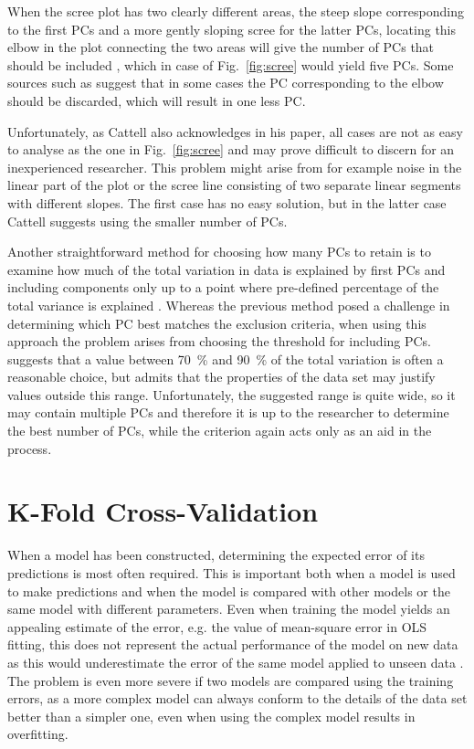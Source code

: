\documentclass[english, oneside]{HYgradu}
\begin{document}
When the scree plot has two clearly different areas, the steep slope corresponding to the first PCs and a more gently sloping scree for the latter PCs, locating this elbow in the plot connecting the two areas will give the number of PCs that should be included \citep{jolliffe2002principal}, which in case of Fig.\ \ref{fig:scree} would yield five PCs. Some sources such as \citep{cattell1966scree} suggest that in some cases the PC corresponding to the elbow should be discarded, which will result in one less PC.

Unfortunately, as Cattell also acknowledges in his paper, all cases are not as easy to analyse as the one in Fig.\ \ref{fig:scree} and may prove difficult to discern for an inexperienced researcher. This problem might arise from for example noise in the linear part of the plot or the scree line consisting of two separate linear segments with different slopes. The first case has no easy solution, but in the latter case Cattell suggests using the smaller number of PCs.

Another straightforward method for choosing how many PCs to retain is to examine how much of the total variation in data is explained by first PCs and including components only up to a point where pre-defined percentage of the total variance is explained \citep{jolliffe2002principal}. Whereas the previous method posed a challenge in determining which PC best matches the exclusion criteria, when using this approach the problem arises from choosing the threshold for including PCs. \citet{jolliffe2002principal} suggests that a value between 70~\% and 90~\% of the total variation is often a reasonable choice, but admits that the properties of the data set may justify values outside this range. Unfortunately, the suggested range is quite wide, so it may contain multiple PCs and therefore it is up to the researcher to determine the best number of PCs, while the criterion again acts only as an aid in the process. 


\section{K-Fold Cross-Validation} \label{sect:cross-validation}
When a model has been constructed, determining the expected error of its predictions is most often required. This is important both when a model is used to make predictions and when the model is compared with other models or the same model with different parameters. Even when training the model yields an appealing estimate of the error, e.g. the value of mean-square error in OLS fitting, this does not represent the actual performance of the model on new data as this would underestimate the error of the same model applied to unseen data \citep{alpaydin2014introduction}. The problem is even more severe if two models are compared using the training errors, as a more complex model can always conform to the details of the data set better than a simpler one, even when using the complex model results in overfitting.
\end{document}
